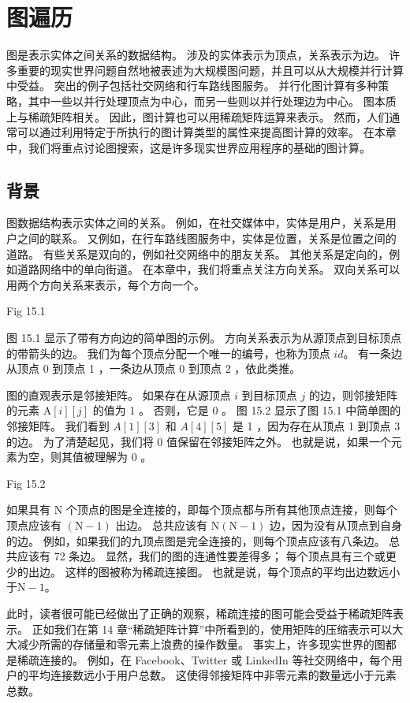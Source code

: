 \section{图遍历}
图是表示实体之间关系的数据结构。 涉及的实体表示为顶点，关系表示为边。 
许多重要的现实世界问题自然地被表述为大规模图问题，并且可以从大规模并行计算中受益。 突出的例子包括社交网络和行车路线图服务。 
并行化图计算有多种策略，其中一些以并行处理顶点为中心，而另一些则以并行处理边为中心。 图本质上与稀疏矩阵相关。 
因此，图计算也可以用稀疏矩阵运算来表示。 然而，人们通常可以通过利用特定于所执行的图计算类型的属性来提高图计算的效率。 
在本章中，我们将重点讨论图搜索，这是许多现实世界应用程序的基础的图计算。

\subsection{背景}
图数据结构表示实体之间的关系。 例如，在社交媒体中，实体是用户，关系是用户之间的联系。 
又例如，在行车路线图服务中，实体是位置，关系是位置之间的道路。 有些关系是双向的，例如社交网络中的朋友关系。 
其他关系是定向的，例如道路网络中的单向街道。 在本章中，我们将重点关注方向关系。 
双向关系可以用两个方向关系来表示，每个方向一个。

{\color{red} Fig 15.1}

图 15.1 显示了带有方向边的简单图的示例。 方向关系表示为从源顶点到目标顶点的带箭头的边。 
我们为每个顶点分配一个唯一的编号，也称为顶点 $i d$。 有一条边从顶点 0 到顶点 1 ，一条边从顶点 0 到顶点 2 ，依此类推。

图的直观表示是邻接矩阵。 如果存在从源顶点 $i$ 到目标顶点 $j$ 的边，则邻接矩阵的元素 $\mathrm{A}[i][j]$ 的值为 1 。 
否则，它是 0 。 图 15.2 显示了图 15.1 中简单图的邻接矩阵。 
我们看到 $A[1][3]$ 和 $A[4][5]$ 是 1 ，因为存在从顶点 1 到顶点 3 的边。 为了清楚起见，我们将 0 值保留在邻接矩阵之外。 
也就是说，如果一个元素为空，则其值被理解为 0 。

{\color{red} Fig 15.2}

如果具有 $\mathrm{N}$ 个顶点的图是全连接的，即每个顶点都与所有其他顶点连接，则每个顶点应该有 $(\mathrm{N}-1)$ 出边。 
总共应该有 $\mathrm{N}(\mathrm{N}-1)$ 边，因为没有从顶点到自身的边。 
例如，如果我们的九顶点图是完全连接的，则每个顶点应该有八条边。 总共应该有 72 条边。 
显然，我们的图的连通性要差得多； 每个顶点具有三个或更少的出边。 这样的图被称为稀疏连接图。 
也就是说，每个顶点的平均出边数远小于$\mathrm{N}-1$。

此时，读者很可能已经做出了正确的观察，稀疏连接的图可能会受益于稀疏矩阵表示。 
正如我们在第 14 章“稀疏矩阵计算”中所看到的，使用矩阵的压缩表示可以大大减少所需的存储量和零元素上浪费的操作数量。 
事实上，许多现实世界的图都是稀疏连接的。 
例如，在 Facebook、Twitter 或 LinkedIn 等社交网络中，每个用户的平均连接数远小于用户总数。 
这使得邻接矩阵中非零元素的数量远小于元素总数。

